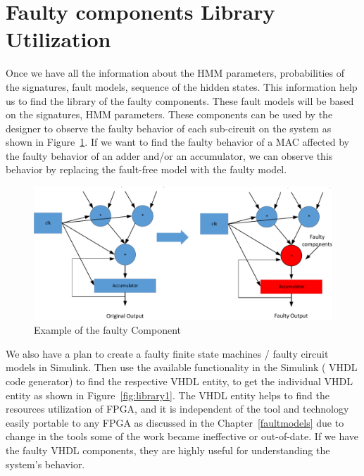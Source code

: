 \section{Faulty components Library Utilization}
Once we have all the information about the HMM parameters, probabilities of the signatures, fault models, sequence of the hidden states. This information help us to find the library of the faulty components. These fault models will be based on the signatures, HMM parameters. These components can be used by the designer to observe the faulty behavior of each sub-circuit on the system as shown in Figure~\ref{fig:lib1}.  If we want to find the faulty behavior of a MAC affected by the faulty behavior of an adder and/or an accumulator, we can observe this behavior by replacing the fault-free model with the faulty model.
\begin{figure}[tb!]
 \centering
  \captionsetup{justification=centering}    
   \includegraphics[scale=0.6]{Figures/MAC.pdf}
   \caption{Example of the faulty Component}
\label{fig:lib1}
\end{figure}
We also have a plan to create a faulty finite state machines / faulty circuit models in Simulink. Then use the available functionality in the Simulink ( VHDL code generator) to find the respective VHDL entity, to get the individual VHDL entity as shown in Figure~\ref{fig:library1}. The VHDL entity helps to find the resources utilization of FPGA, and it is independent of the tool and technology easily portable to any FPGA as discussed in the Chapter~\ref{faultmodels} due to change in the tools some of the work became ineffective or out-of-date. If we have the faulty VHDL components, they are highly useful for understanding the system's behavior.
